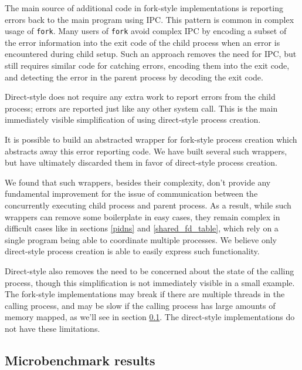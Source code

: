 \documentclass[letterpaper,twocolumn,10pt]{article}
\begin{document}
The main source of additional code in fork-style implementations
is reporting errors back to the main program using IPC.
This pattern is common in complex usage of \texttt{fork}\cite{posix_spawn_error_pipe}\cite{python_subprocess_errpipe}.
Many users of \texttt{fork} avoid complex IPC
by encoding a subset of the error information into the exit code of the child process
when an error is encountered during child setup.
Such an approach removes the need for IPC,
but still requires similar code for catching errors, encoding them into the exit code,
and detecting the error in the parent process by decoding the exit code.

Direct-style does not require any extra work to report errors from the child process;
errors are reported just like any other system call.
This is the main immediately visible simplification of using direct-style process creation.

It is possible to build an abstracted wrapper for fork-style process creation
which abstracts away this error reporting code.
We have built several such wrappers,
but have ultimately discarded them in favor of direct-style process creation\cite{sfork}.

We found that such wrappers, besides their complexity,
don't provide any fundamental improvement
for the issue of communication between the concurrently executing child process and parent process.
As a result, while such wrappers can remove some boilerplate in easy cases,
they remain complex in difficult cases like in sections \ref{pidns} and \ref{shared_fd_table},
which rely on a single program being able to coordinate multiple processes.
We believe only direct-style process creation is able to easily express such functionality.

Direct-style also removes the need to be concerned about the state of the calling process,
though this simplification is not immediately visible in a small example.
The fork-style implementations may break if there are multiple threads in the calling process,
and may be slow if the calling process has large amounts of memory mapped, as we'll see in section \ref{subprocess_bench}.
The direct-style implementations do not have these limitations.
\subsection{Microbenchmark results}\label{subprocess_bench}
\end{document}

